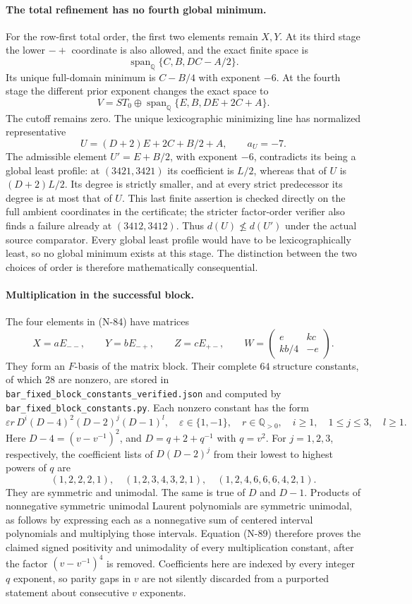\paragraph{The total refinement has no fourth global minimum.}
For the row-first total order, the first two elements remain $X,Y$.
At its third stage the lower $-+$ coordinate is also allowed, and
the exact finite space is
\[
 \operatorname{span}_{\mathbb Q}\{C,B,DC-A/2\}.
\]
Its unique full-domain minimum is $C-B/4$ with exponent $-6$.
At the fourth stage the different prior exponent changes the exact
space to
\[
 V=S T_0\oplus
          \operatorname{span}_{\mathbb Q}\{E,B,DE+2C+A\}.
 \tag{N-86}
\]
The cutoff remains zero.  The unique lexicographic minimizing line
has normalized representative
\[
 U=(D+2)E+2C+B/2+A,
 \qquad a_U=-7.
 \tag{N-87}
\]
The admissible element $U'=E+B/2$, with exponent $-6$, contradicts
its being a global least profile: at $(3421,3421)$ its coefficient
is $L/2$, whereas that of $U$ is $(D+2)L/2$.  Its degree is strictly
smaller, and at every strict predecessor its degree is at most that
of $U$.  This last finite assertion is checked directly on the full
ambient coordinates in the certificate; the stricter factor-order
verifier also finds a failure already at $(3412,3412)$.
Thus $d(U)\not\le d(U')$ under the actual source comparator.
Every global least profile would have to be lexicographically least,
so no global minimum exists at this stage.  The distinction between
the two choices of order is therefore mathematically consequential.

\paragraph{Multiplication in the successful block.}
The four elements in (N-84) have matrices
\[
 X=aE_{--},\qquad Y=bE_{-+},\qquad Z=cE_{+-},\qquad
 W=\begin{pmatrix}e&kc\\ kb/4&-e\end{pmatrix}.
 \tag{N-88}
\]
They form an $F$-basis of the matrix block.  Their complete $64$
structure constants, of which $28$ are nonzero, are stored in
\nolinkurl{bar_fixed_block_constants_verified.json} and computed
by \nolinkurl{bar_fixed_block_constants.py}.  Each nonzero constant
has the form
\[
 \varepsilon r\,D^i(D-4)^2(D-2)^j(D-1)^l,
 \quad \varepsilon\in\{1,-1\},\quad r\in\mathbb Q_{>0},
 \quad i\ge1,\quad1\le j\le3,\quad l\ge1.
 \tag{N-89}
\]
Here $D-4=(v-v^{-1})^2$, and $D=q+2+q^{-1}$ with $q=v^2$.
For $j=1,2,3$, respectively, the coefficient lists of
$D(D-2)^j$ from their lowest to highest powers of $q$ are
\[
 (1,2,2,2,1),\quad
 (1,2,3,4,3,2,1),\quad
 (1,2,4,6,6,6,4,2,1).
\]
They are symmetric and unimodal.  The same is true of $D$ and
$D-1$.  Products of nonnegative symmetric unimodal Laurent
polynomials are symmetric unimodal, as follows by expressing each
as a nonnegative sum of centered interval polynomials and multiplying
those intervals.  Equation (N-89) therefore proves the claimed
signed positivity and unimodality of every multiplication constant,
after the factor $(v-v^{-1})^4$ is removed.  Coefficients here are
indexed by every integer $q$ exponent, so parity gaps in $v$ are
not silently discarded from a purported statement about consecutive
$v$ exponents.

